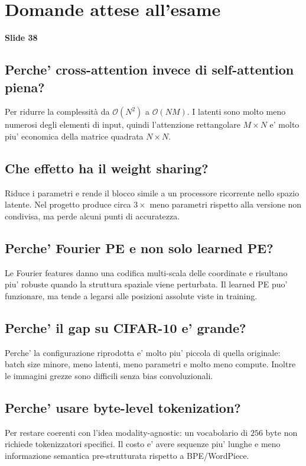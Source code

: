 \documentclass[11pt,a4paper]{article}
\newcommand{\bigO}{\mathcal{O}}
\newcommand{\slide}[1]{\textcolor{mainblue}{\textbf{Slide #1}}}
\begin{document}
\appendix
\section{Domande attese all'esame}
\slide{38}

\subsection{Perche' cross-attention invece di self-attention piena?}
Per ridurre la complessit\`a da $\bigO(N^2)$ a $\bigO(NM)$. I latenti sono
molto meno numerosi degli elementi di input, quindi l'attenzione rettangolare
$M \times N$ e' molto piu' economica della matrice quadrata $N \times N$.

\subsection{Che effetto ha il weight sharing?}
Riduce i parametri e rende il blocco simile a un processore ricorrente nello
spazio latente. Nel progetto produce circa $3\times$ meno parametri rispetto
alla versione non condivisa, ma perde alcuni punti di accuratezza.

\subsection{Perche' Fourier PE e non solo learned PE?}
Le Fourier features danno una codifica multi-scala delle coordinate e risultano
piu' robuste quando la struttura spaziale viene perturbata. Il learned PE puo'
funzionare, ma tende a legarsi alle posizioni assolute viste in training.

\subsection{Perche' il gap su CIFAR-10 e' grande?}
Perche' la configurazione riprodotta e' molto piu' piccola di quella originale:
batch size minore, meno latenti, meno parametri e molto meno compute. Inoltre
le immagini grezze sono difficili senza bias convoluzionali.

\subsection{Perche' usare byte-level tokenization?}
Per restare coerenti con l'idea modality-agnostic: un vocabolario di $256$ byte
non richiede tokenizzatori specifici. Il costo e' avere sequenze piu' lunghe e
meno informazione semantica pre-strutturata rispetto a BPE/WordPiece.
\end{document}
